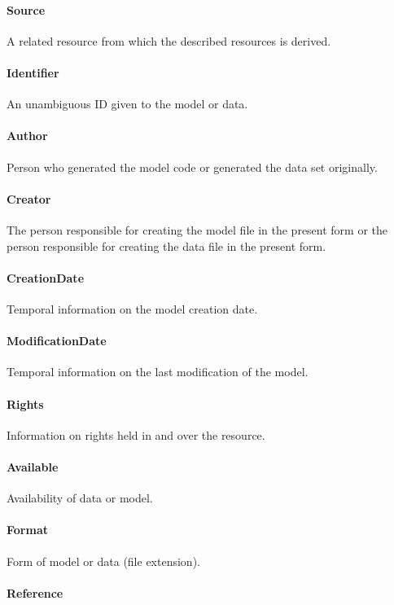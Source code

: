 \documentclass[a4paper]{report}
\begin{document}
\paragraph{Source}
A related resource from which the described resources is derived.

\paragraph{Identifier}
An unambiguous ID given to the model or data.

\paragraph{Author}
Person who generated the model code or generated the data set originally.

\paragraph{Creator}
The person responsible for creating the model file in the present form or the person responsible for creating the data file in the present form.

\paragraph{CreationDate}
Temporal information on the model creation date.

\paragraph{ModificationDate}
Temporal information on the last modification of the model.

\paragraph{Rights}
Information on rights held in and over the resource.

\paragraph{Available}
Availability of data or model.

\paragraph{Format}
Form of model or data (file extension).

\paragraph{Reference}
\end{document}
